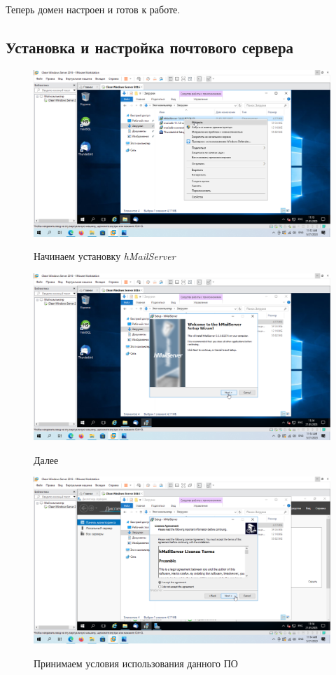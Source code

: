 \documentclass[a4paper]{article}
\begin{document}
  Теперь домен настроен и готов к работе.

  \subsection{Установка и настройка почтового сервера}

  \begin{figure}[H]
    \centering
    \includegraphics[width=\textwidth]{11_0046}
    \label{img:46}
    \caption{Начинаем установку \textit{hMailServer}}
  \end{figure}

  \begin{figure}[H]
    \centering
    \includegraphics[width=\textwidth]{11_0047}
    \label{img:47}
    \caption{Далее}
  \end{figure}

  \begin{figure}[H]
    \centering
    \includegraphics[width=\textwidth]{11_0048}
    \label{img:48}
    \caption{Принимаем условия использования данного ПО}
  \end{figure}
\end{document}
